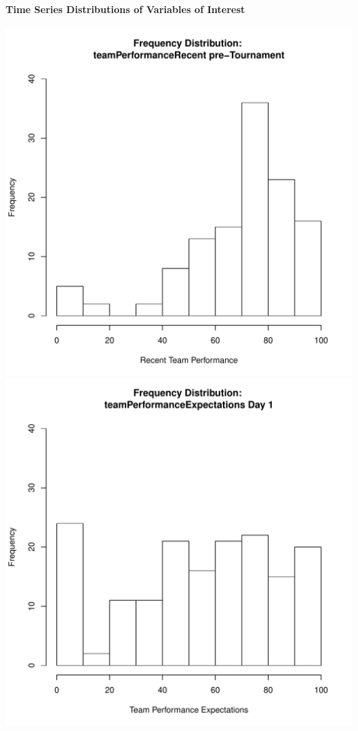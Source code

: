 \documentclass[12pt]{report}
\begin{document}
\paragraph{Time Series Distributions of Variables of Interest}
\includegraphics[scale =.4]{../images/distTeamPerformancePre.pdf}
\includegraphics[scale =.4]{../images/distTeamPerfExpDay1.pdf}
\end{document}
